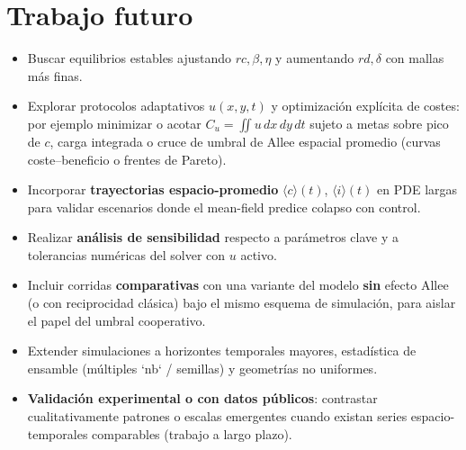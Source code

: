 \section{Trabajo futuro}
\begin{itemize}
  \item Buscar equilibrios estables ajustando $rc,\beta,\eta$ y aumentando $rd,\delta$ con mallas más finas.
  \item Explorar protocolos adaptativos $u(x,y,t)$ y optimización explícita de costes: por ejemplo minimizar o acotar $C_u=\iint u\,dx\,dy\,dt$ sujeto a metas sobre pico de $c$, carga integrada o cruce de umbral de Allee espacial promedio (curvas coste--beneficio o frentes de Pareto).
  \item Incorporar \textbf{trayectorias espacio-promedio} $\langle c\rangle(t)$, $\langle i\rangle(t)$ en PDE largas para validar escenarios donde el mean-field predice colapso con control.
  \item Realizar \textbf{análisis de sensibilidad} respecto a parámetros clave y a tolerancias numéricas del solver con $u$ activo.
  \item Incluir corridas \textbf{comparativas} con una variante del modelo \textbf{sin} efecto Allee (o con reciprocidad clásica) bajo el mismo esquema de simulación, para aislar el papel del umbral cooperativo.
  \item Extender simulaciones a horizontes temporales mayores, estadística de ensamble (múltiples `nb` / semillas) y geometrías no uniformes.
  \item \textbf{Validación experimental o con datos públicos}: contrastar cualitativamente patrones o escalas emergentes cuando existan series espacio-temporales comparables (trabajo a largo plazo).
\end{itemize}



















